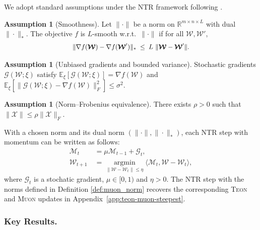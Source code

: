 \documentclass{article}
\newcommand{\ten}[1]{\bm{\mathcal{#1}}}
\theoremstyle{plain}
\theoremstyle{definition}
\newtheorem{assumption}[theorem]{Assumption}
\theoremstyle{remark}
\DeclareMathOperator*{\argmin}{argmin}
\begin{document}
We adopt standard assumptions under the NTR framework following \cite{kovalev2025understanding, khaled2025muonbp}.

\begin{assumption}[Smoothness]
\label{ass:teon_smooth}
Let $\|\cdot\|$ be a norm on $\mathbb{R}^{m\times n\times L}$ with dual $\|\cdot\|_{*}$. The objective $f$ is $L$-smooth w.r.t.\ $\|\cdot\|$ if for all $\ten{W},\ten{W}'$,
\begin{equation}
\small
\label{eq:smooth_geom}
\|\nabla f(\ten{W})-\nabla f(\ten{W}')\|_{*}
\;\le\;
L\ \|\ten{W}-\ten{W}'\|.
\normalsize
\end{equation}
\end{assumption}


\begin{assumption}[Unbiased gradients and bounded variance]
\label{ass:teon_var}
Stochastic gradients $\ten{G}(\ten{W};\xi)$ satisfy
$\mathbb{E}_\xi[\ten{G}(\ten{W};\xi)]=\nabla f(\ten{W})$
and
$\mathbb{E}_\xi\!\left[\|\ten{G}(\ten{W};\xi)-\nabla f(\ten{W})\|_F^2\right]\le \sigma^2$.
\end{assumption}

\begin{assumption}[Norm--Frobenius equivalence]
\label{ass:teon_normeq}
There exists $\rho>0$ such that $\|\ten{X}\| \le \rho \|\ten{X}\|_F$.
\end{assumption}

With a chosen norm and its dual norm $(\|\cdot\|,\|\cdot\|_{*})$, each NTR step with momentum can be written as follows:
\begin{equation}
\label{eq:teon_ntr}
\begin{aligned}
\ten{M}_t &\ =\mu\ten{M}_{t-1}+\ten{G}_t,
\\
\ten{W}_{t+1} &\ =\argmin \limits_{\|\ten{W}-\ten{W}_t\|\le \eta}
\langle \ten{M}_t,\ten{W}-\ten{W}_t\rangle,
\end{aligned}
\end{equation}
where $\ten{G}_t$ is a stochatic gradient, $\mu\in[0,1)$ and $\eta>0$. The NTR step with the norms defined in Definition \ref{def:muon_norm} recovers the corresponding \textsc{Teon} and \textsc{Muon} updates in Appendix~\ref{app:teon-muon-steepest}.


\subsubsection{Key Results.} 
\end{document}
